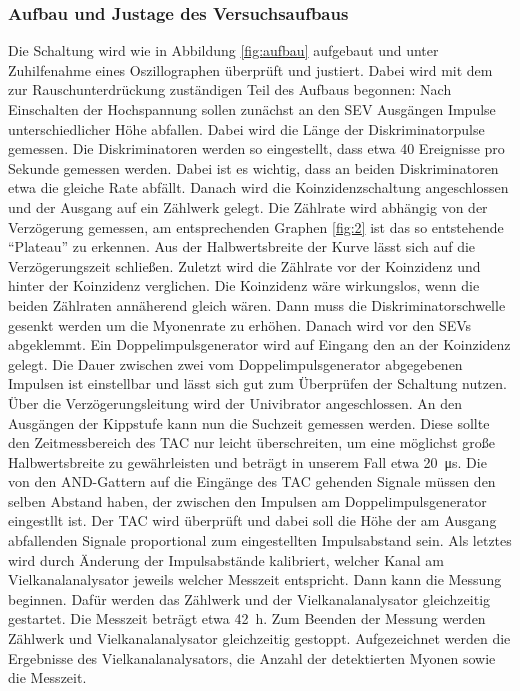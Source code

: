 \documentclass[
  bibliography=totoc,     %
  captions=tableheading,  %
  titlepage=firstiscover, %
]{scrartcl}
\begin{document}
  \subsubsection{Aufbau und Justage des Versuchsaufbaus}
  Die Schaltung wird wie in Abbildung \ref{fig:aufbau} aufgebaut und unter Zuhilfenahme eines Oszillographen
  überprüft und justiert. Dabei wird mit dem zur Rauschunterdrückung zuständigen
  Teil des Aufbaus begonnen:
  Nach Einschalten der Hochspannung sollen zunächst an den SEV Ausgängen Impulse
  unterschiedlicher Höhe abfallen.
  Dabei wird die Länge der Diskriminatorpulse gemessen.
  Die Diskriminatoren werden so eingestellt, dass etwa 40
  Ereignisse pro Sekunde gemessen werden. Dabei ist es wichtig, dass an beiden
  Diskriminatoren etwa die gleiche Rate abfällt.
  Danach wird die Koinzidenzschaltung angeschlossen und der Ausgang auf ein
  Zählwerk gelegt. Die Zählrate wird abhängig von der Verzögerung gemessen, am
  entsprechenden Graphen \ref{fig:2} ist das so entstehende \enquote{Plateau} zu erkennen. Aus der Halbwertsbreite
  der Kurve lässt sich auf die Verzögerungszeit schließen.
  Zuletzt wird die Zählrate vor der Koinzidenz und hinter der Koinzidenz verglichen.
  Die Koinzidenz wäre wirkungslos, wenn die beiden Zählraten annäherend gleich wären.
  Dann muss die Diskriminatorschwelle gesenkt werden um die
  Myonenrate zu erhöhen.
  Danach wird vor den SEVs abgeklemmt. Ein
  Doppelimpulsgenerator wird auf Eingang den an der Koinzidenz gelegt.
  Die Dauer zwischen zwei vom Doppelimpulsgenerator abgegebenen Impulsen ist einstellbar
  und lässt sich gut zum Überprüfen der Schaltung nutzen.
  Über die Verzögerungsleitung wird der Univibrator angeschlossen. An den
  Ausgängen der Kippstufe kann nun die Suchzeit gemessen werden. Diese sollte den
  Zeitmessbereich des TAC nur leicht überschreiten, um eine möglichst große
  Halbwertsbreite zu gewährleisten und beträgt in unserem Fall etwa
  \SI{20}{\micro\second}. Die von den AND-Gattern auf die Eingänge des TAC gehenden
  Signale müssen den selben Abstand haben, der zwischen den Impulsen am Doppelimpulsgenerator
  eingestllt ist. Der TAC wird überprüft und dabei soll die Höhe der am Ausgang abfallenden
  Signale proportional zum eingestellten Impulsabstand sein.
  Als letztes wird durch Änderung der Impulsabstände kalibriert, welcher Kanal
  am Vielkanalanalysator jeweils welcher Messzeit entspricht. Dann kann die Messung
  beginnen. Dafür werden das Zählwerk und der Vielkanalanalysator gleichzeitig
  gestartet. Die Messzeit beträgt etwa \SI{42}{\hour}.
  Zum Beenden der Messung werden Zählwerk und Vielkanalanalysator gleichzeitig gestoppt.
  Aufgezeichnet werden die Ergebnisse des Vielkanalanalysators, die Anzahl der detektierten
  Myonen sowie die Messzeit.
\clearpage
\end{document}
